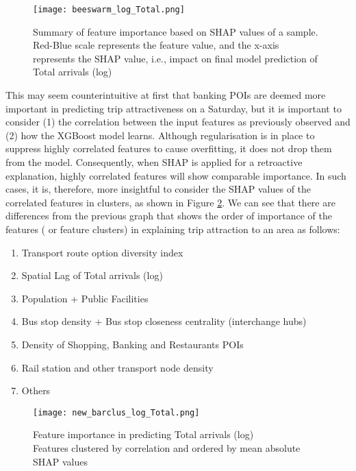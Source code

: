 \begin{figure}[!ht]
    \centering
    \texttt{[image: beeswarm\_log\_Total.png]}
    \captionsetup{justification=centering}
    \caption{Summary of feature importance based on SHAP values of a sample. Red-Blue scale represents the feature value, and the x-axis represents the SHAP value, i.e., impact on final model prediction of Total arrivals (log)}
    \label{fig:beeswarmtotal}
\end{figure}

This may seem counterintuitive at first that banking POIs are deemed more important in predicting trip attractiveness on a Saturday, but it is important to consider (1) the correlation between the input features as previously observed and (2) how the XGBoost model learns. Although regularisation is in place to suppress highly correlated features to cause overfitting, it does not drop them from the model. Consequently, when SHAP is applied for a retroactive explanation, highly correlated features will show comparable importance. In such cases, it is, therefore, more insightful to consider the SHAP values of the correlated features in clusters, as shown in Figure \ref{fig:barclustertotal}. We can see that there are differences from the previous graph that shows the order of importance of the features ( or feature clusters) in explaining trip attraction to an area as follows:

\begin{enumerate}
    \setlength\itemsep{0em}
    \item Transport route option diversity index
    \item Spatial Lag of Total arrivals (log)
    \item Population + Public Facilities
    \item Bus stop density + Bus stop closeness centrality (interchange hubs)
    \item Density of Shopping, Banking and Restaurants POIs
    \item Rail station and other transport node density
    \item Others
\end{enumerate}

\begin{figure}[!ht]
    \centering
    \texttt{[image: new\_barclus\_log\_Total.png]}
    \captionsetup{justification=centering}
    \caption{Feature importance in predicting Total arrivals (log)\\ Features clustered by correlation and ordered by mean absolute SHAP values}
    \label{fig:barclustertotal}
\end{figure}

